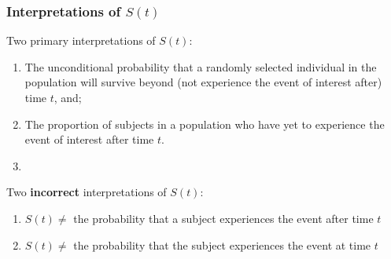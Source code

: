 \begin{frame}
\frametitle{Interpretations of $S(t)$}
Two primary interpretations of $S(t)$:
\begin{enumerate}
\item The unconditional probability that a randomly selected individual in the population will survive beyond (not experience the event of interest after) time $t$, and;
\item The proportion of subjects in a population who have yet to experience the event of interest after time $t$.
\item[]
\end{enumerate}
Two \textbf{incorrect} interpretations of $S(t)$:
\begin{enumerate}
\item $S(t)\neq$ the probability that a subject experiences the event after time $t$
\item $S(t)\neq$ the probability that the subject experiences the event at time $t$
\end{enumerate}
\end{frame}



